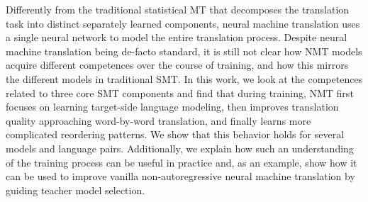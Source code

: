 Differently from the traditional statistical MT that decomposes the translation task into distinct separately learned components, neural machine translation uses a single neural network to model the entire translation process. Despite neural machine translation being de-facto standard, it is still not clear how NMT models acquire different competences over the course of training, and how this mirrors the different models in traditional SMT. In this work, we look at the competences related to three core SMT components and find that during training, NMT first focuses on learning target-side language modeling, then improves translation quality approaching word-by-word translation, and finally learns more complicated reordering patterns. We show that this behavior holds for several models and language pairs. Additionally, we explain how such an understanding of the training process can be useful in practice and, as an example, show how it can be used to improve vanilla non-autoregressive neural machine translation by guiding teacher model selection.
